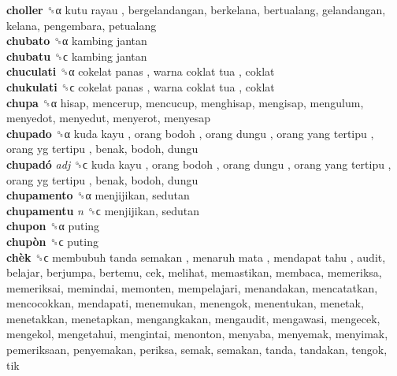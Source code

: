\textbf{choller} ␝α   kutu rayau , bergelandangan, berkelana, bertualang, gelandangan, kelana, pengembara, petualang  \\
\textbf{chubato} ␝α   kambing jantan   \\
\textbf{chubatu} ␝ϲ   kambing jantan   \\
\textbf{chuculati} ␝α   cokelat panas ,  warna coklat tua , coklat  \\
\textbf{chukulati} ␝ϲ   cokelat panas ,  warna coklat tua , coklat  \\
\textbf{chupa} ␝α  hisap, mencerup, mencucup, menghisap, mengisap, mengulum, menyedot, menyedut, menyerot, menyesap  \\
\textbf{chupado} ␝α   kuda kayu ,  orang bodoh ,  orang dungu ,  orang yang tertipu ,  orang yg tertipu , benak, bodoh, dungu  \\
\textbf{chupadó} \emph{adj}  ␝ϲ   kuda kayu ,  orang bodoh ,  orang dungu ,  orang yang tertipu ,  orang yg tertipu , benak, bodoh, dungu  \\
\textbf{chupamento} ␝α  menjijikan, sedutan  \\
\textbf{chupamentu} \emph{n}  ␝ϲ  menjijikan, sedutan  \\
\textbf{chupon} ␝α  puting  \\
\textbf{chupòn} ␝ϲ  puting  \\
\textbf{chèk} ␝ϲ   membubuh tanda semakan ,  menaruh mata ,  mendapat tahu , audit, belajar, berjumpa, bertemu, cek, melihat, memastikan, membaca, memeriksa, memeriksai, memindai, memonten, mempelajari, menandakan, mencatatkan, mencocokkan, mendapati, menemukan, menengok, menentukan, menetak, menetakkan, menetapkan, mengangkakan, mengaudit, mengawasi, mengecek, mengekol, mengetahui, mengintai, menonton, menyaba, menyemak, menyimak, pemeriksaan, penyemakan, periksa, semak, semakan, tanda, tandakan, tengok, tik  \\
